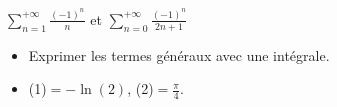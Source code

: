 $\displaystyle \sum_{n=1}^{+\infty} \frac{(-1)^n}{n}$ et $\displaystyle \sum_{n=0}^{+\infty} \frac{(-1)^n}{2n+1}$

\begin{itemize}
    \item Exprimer les termes généraux avec une intégrale. 
    \item (1)$= -\ln(2)$, (2)$= \frac{\pi}{4}$.
\end{itemize}